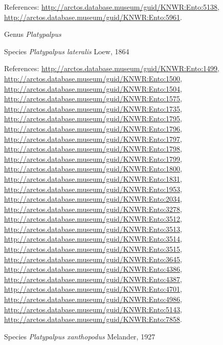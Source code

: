 \documentclass[9pt, article]{memoir}
\begin{document}
\begin{multicols}{2}
References: 
\url{http://arctos.database.museum/guid/KNWR:Ento:5138}, 
\url{http://arctos.database.museum/guid/KNWR:Ento:5961}.

\vspace{6pt}\noindent\hspace{30pt}Genus \textit{Platypalpus}


\vspace{6pt}\noindent\hspace{36pt}Species \textit{Platypalpus lateralis} Loew, 1864


References: 
\url{http://arctos.database.museum/guid/KNWR:Ento:1499}, 
\url{http://arctos.database.museum/guid/KNWR:Ento:1500}, 
\url{http://arctos.database.museum/guid/KNWR:Ento:1504}, 
\url{http://arctos.database.museum/guid/KNWR:Ento:1575}, 
\url{http://arctos.database.museum/guid/KNWR:Ento:1735}, 
\url{http://arctos.database.museum/guid/KNWR:Ento:1795}, 
\url{http://arctos.database.museum/guid/KNWR:Ento:1796}, 
\url{http://arctos.database.museum/guid/KNWR:Ento:1797}, 
\url{http://arctos.database.museum/guid/KNWR:Ento:1798}, 
\url{http://arctos.database.museum/guid/KNWR:Ento:1799}, 
\url{http://arctos.database.museum/guid/KNWR:Ento:1800}, 
\url{http://arctos.database.museum/guid/KNWR:Ento:1831}, 
\url{http://arctos.database.museum/guid/KNWR:Ento:1953}, 
\url{http://arctos.database.museum/guid/KNWR:Ento:2034}, 
\url{http://arctos.database.museum/guid/KNWR:Ento:3278}, 
\url{http://arctos.database.museum/guid/KNWR:Ento:3512}, 
\url{http://arctos.database.museum/guid/KNWR:Ento:3513}, 
\url{http://arctos.database.museum/guid/KNWR:Ento:3514}, 
\url{http://arctos.database.museum/guid/KNWR:Ento:3515}, 
\url{http://arctos.database.museum/guid/KNWR:Ento:3645}, 
\url{http://arctos.database.museum/guid/KNWR:Ento:4386}, 
\url{http://arctos.database.museum/guid/KNWR:Ento:4387}, 
\url{http://arctos.database.museum/guid/KNWR:Ento:4701}, 
\url{http://arctos.database.museum/guid/KNWR:Ento:4986}, 
\url{http://arctos.database.museum/guid/KNWR:Ento:5143}, 
\url{http://arctos.database.museum/guid/KNWR:Ento:7858}.

\vspace{6pt}\noindent\hspace{36pt}Species \textit{Platypalpus xanthopodus} Melander, 1927



\end{multicols}
\end{document}

